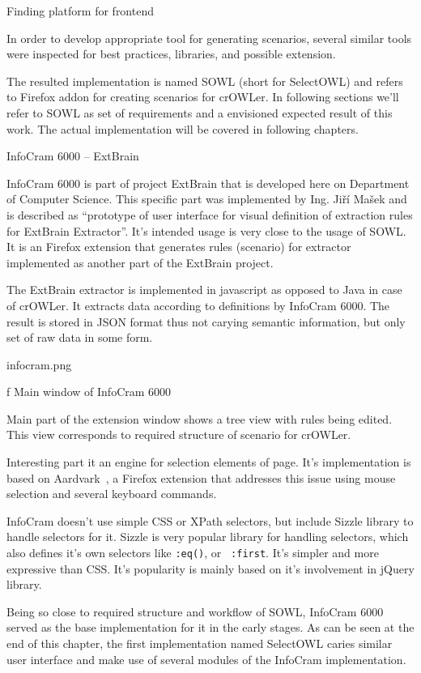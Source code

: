 \sec Finding platform for frontend

In order to develop appropriate tool for generating scenarios, several similar
tools were inspected for best practices, libraries, and possible extension. 

The resulted implementation is named SOWL (short for SelectOWL) and refers to
Firefox addon for creating scenarios for crOWLer. In following sections we'll
refer to SOWL as set of requirements and a envisioned expected result of this
work. The actual implementation will be covered in following chapters. 


\secc InfoCram 6000 -- ExtBrain

InfoCram 6000 is part of project ExtBrain 
that is developed here on Department of Computer Science. This specific part
was implemented by Ing. Jiří Mašek and is described as ``prototype of user
interface for visual definition of extraction rules for ExtBrain Extractor''.
It's intended usage is very close to the usage of SOWL. It is an Firefox
extension that generates rules (scenario) for extractor implemented as another
part of the ExtBrain project. 

The ExtBrain extractor is implemented in javascript as opposed to Java in case
of crOWLer. It extracts data according to definitions by InfoCram 6000. The
result is stored in JSON format thus not carying semantic information, but only
set of raw data in some form. 

\midinsert
\picw=7cm \cinspic infocram.png
\caption/f Main window of InfoCram 6000
\endinsert

Main part of the extension window shows a tree view with rules being edited.
This view corresponds to required structure of scenario for crOWLer. 

Interesting part it an engine for selection elements of page. It's
implementation is based on
Aardvark~, a
Firefox extension that addresses this issue using mouse selection and several
keyboard commands. 

InfoCram doesn't use simple CSS or XPath selectors, but include Sizzle library
to handle selectors for it. Sizzle is very popular library for handling
selectors, which also defines it's own selectors like {\tt :eq()}, or {\tt
:first}. It's simpler and more expressive than CSS. It's popularity is 
mainly based on it's involvement in jQuery library. 

Being so close to required structure and workflow of SOWL, InfoCram 6000 served
as the base implementation for it in the early stages. As can be seen at the end 
of this chapter, the first implementation named SelectOWL caries similar user
interface and make use of several modules of the InfoCram implementation. 


